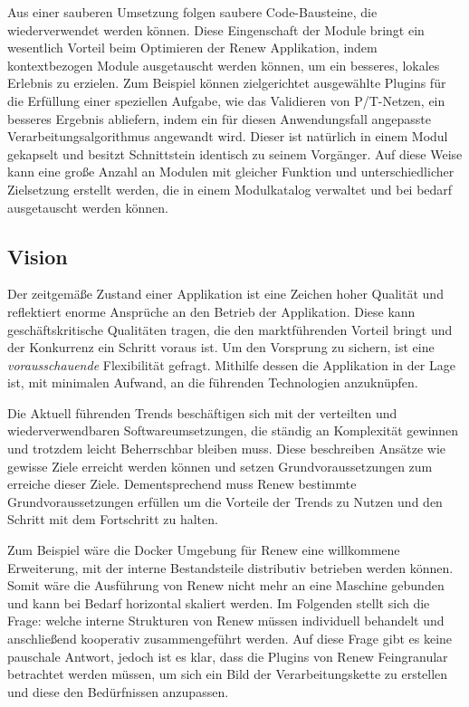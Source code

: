 Aus einer sauberen Umsetzung folgen saubere Code-Bausteine, die wiederverwendet werden können. Diese Eingenschaft der Module bringt ein wesentlich Vorteil beim Optimieren der Renew Applikation, indem kontextbezogen Module ausgetauscht werden können, um ein besseres, lokales Erlebnis zu erzielen. Zum Beispiel können zielgerichtet ausgewählte Plugins für die Erfüllung einer speziellen Aufgabe, wie das Validieren von P/T-Netzen, ein besseres Ergebnis abliefern, indem ein für diesen Anwendungsfall angepasste Verarbeitungsalgorithmus angewandt wird. Dieser ist natürlich in einem Modul gekapselt und besitzt Schnittstein identisch zu seinem Vorgänger. Auf diese Weise kann eine große Anzahl an Modulen mit gleicher Funktion und unterschiedlicher Zielsetzung erstellt werden, die in einem Modulkatalog verwaltet und bei bedarf ausgetauscht werden können.

\subsection{Vision} \label{sub:moderner_zustand}
Der zeitgemäße Zustand einer Applikation ist eine Zeichen hoher Qualität und reflektiert enorme Ansprüche an den Betrieb der Applikation. Diese kann geschäftskritische Qualitäten tragen, die den marktführenden Vorteil bringt und der Konkurrenz ein Schritt voraus ist. Um den Vorsprung zu sichern, ist eine \textit{vorausschauende} Flexibilität gefragt. Mithilfe dessen die Applikation in der Lage ist, mit minimalen Aufwand, an die führenden Technologien anzuknüpfen. 

Die Aktuell führenden Trends beschäftigen sich mit der verteilten und wiederverwendbaren Softwareumsetzungen, die ständig an Komplexität gewinnen und trotzdem leicht Beherrschbar bleiben muss. Diese beschreiben Ansätze wie gewisse Ziele erreicht werden können und setzen Grundvoraussetzungen zum erreiche dieser Ziele. Dementsprechend muss Renew bestimmte Grundvoraussetzungen erfüllen um die Vorteile der Trends zu Nutzen und den Schritt mit dem Fortschritt zu halten.  \bigbreak


Zum Beispiel wäre die Docker Umgebung für Renew eine willkommene Erweiterung, mit der interne Bestandsteile distributiv betrieben werden können. Somit wäre die Ausführung von Renew nicht mehr an eine Maschine gebunden und kann bei Bedarf horizontal skaliert werden. Im Folgenden stellt sich die Frage: welche interne Strukturen von Renew müssen individuell behandelt und anschließend kooperativ zusammengeführt werden. Auf diese Frage gibt es keine pauschale Antwort, jedoch ist es klar, dass die Plugins von Renew Feingranular betrachtet werden müssen, um sich ein Bild der Verarbeitungskette zu erstellen und diese den Bedürfnissen anzupassen. \bigbreak

